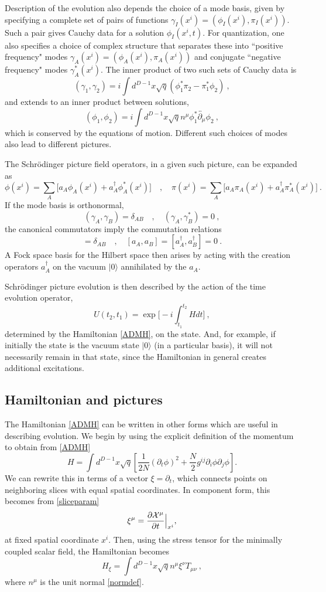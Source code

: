 \documentclass[12pt]{article}
\numberwithin{equation}{section}
\newcommand{\beq}{\begin{equation}}
\newcommand{\eeq}{\end{equation}}
\begin{document}
Description of the evolution also depends the choice of a mode basis, given by specifying a complete set of pairs of functions $\gamma_I(x^i)=(\phi_I(x^i),\pi_I(x^i))$.  Such a pair gives Cauchy data for a solution $\phi_I(x^i,t)$.  For quantization, one also specifies  a choice of complex structure 
\cite{More,Kay,AgAs} that separates these into ``positive frequency" modes $\gamma_A(x^i)=(\phi_A(x^i),\pi_A(x^i))$ and conjugate ``negative frequency" modes $\gamma_A^*(x^i)$.  
The inner product of two such sets of Cauchy data is 
\beq
(\gamma_1, \gamma_2)= i\int d^{D-1}x \sqrt{q}(\phi_1^*\pi_2-\pi_1^*\phi_2)\ ,
\eeq
and extends to an inner product between solutions,  
\beq\label{InnerProduct}
(\phi_1,\phi_2) = i \int d^{D-1} x \sqrt{q} n^\mu \phi_1^*\overleftrightarrow{\partial_\mu} \phi_2\ ,
\eeq
which is conserved by the equations of motion.  Different such choices of modes also lead to different pictures.

The Schr\"odinger picture field operators, in a given such picture, can be expanded as
\beq\label{opexps}
\phi(x^i) = \sum_A \big[a_A \phi_A(x^i)+a_A^{\dagger} \phi_A^*(x^i)\big]\quad ,\quad \pi(x^i) = \sum_A \big[a_A\pi_A(x^i)+a_A^{\dagger} \pi_A^*(x^i)\big]\ .
\eeq
If the mode basis is orthonormal,
\beq
(\gamma_A,\gamma_B) = \delta_{AB}\quad , \quad (\gamma_A,\gamma_B^*) = 0\ ,
\eeq 
the canonical commutators imply the commutation relations
\beq
[a_A, a_B^{\dagger}] = \delta_{AB}\quad ,\quad  [a_A, a_B]=[a_A^{\dagger}, a_B^{\dagger}] = 0\ .
\eeq
A Fock space basis for the Hilbert space then arises by acting with the creation operators $a_A^\dagger$ on the vacuum $|0\rangle$ annihilated by the $a_A$.  

Schr\"odinger picture evolution is then described by the action of the time evolution operator,
\beq
U(t_2, t_1)= \exp{\bigg[-i\int_{t_1}^{t_2} H dt\bigg]}\ ,
\eeq
determined by the Hamiltonian \eqref{ADMH}, on the state.  And, for example, if initially the state is the vacuum state $|0\rangle$ (in a particular basis), it will not necessarily remain in that state, since the Hamiltonian in general creates additional excitations.


\subsection{Hamiltonian and pictures}\label{HandP}

The Hamiltonian \eqref{ADMH} can be written in other forms which are useful in describing evolution. We begin by using  the explicit definition of the 
momentum to obtain from \eqref{ADMH}
\beq\label{LapseForm}
H= \int d^{D-1}x \sqrt{q} \left[\frac{1}{2N} (\partial_t\phi)^2+\frac{N}{2}g^{ij} \partial_i \phi \partial_j \phi \right].
\eeq 
We can rewrite this in terms of a vector $\xi=\partial_t$, which connects points on neighboring slices with equal spatial coordinates.
In component form, this becomes from \eqref{sliceparam}
\beq
\xi^{\mu} = \frac{\partial {\cal X}^{\mu}}{\partial t}\Big\vert_{x^i},
\eeq 
at fixed spatial coordinate $x^i$. Then, using the stress tensor for the minimally coupled scalar field, the  Hamiltonian becomes
\beq\label{StressTensorForm}
H_{\xi}= \int d^{D-1}x \sqrt{q} n^{\mu} \xi^{\nu} T_{\mu\nu}\ ,
\eeq
where $n^{\mu}$ is the unit normal \eqref{normdef}. 
\end{document}
